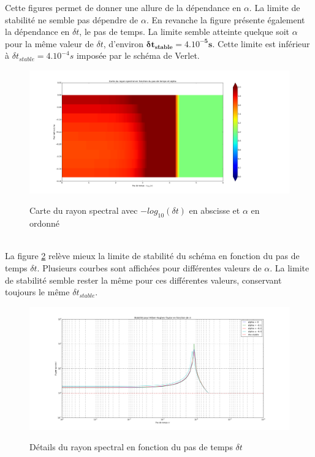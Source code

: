 \documentclass[11pt, a4paper]{article}
\begin{document}
Cette figures permet de donner une allure de la dépendance en $\alpha$. La limite de stabilité ne semble pas dépendre de $\alpha$. En revanche la figure présente également la dépendance en $\delta t$, le pas de temps. La limite semble atteinte quelque soit $\alpha$ pour la même valeur de $\delta t$, d'environ $ \mathbf{\delta t_{stable} = 4.10^{-5}s }$. Cette limite est inférieur à $\delta t_{stable} = 4.10^{-4}s$ imposée par le schéma de Verlet.
\begin{figure}
	\centering
	\includegraphics[width=1\linewidth]{figures/Part5/MapRhoHHT.png}
	\label{MapRhoHHT}
	\caption{Carte du rayon spectral avec $-log_{10}(\delta t)$ en abscisse et $\alpha$ en ordonné}
\end{figure}
\\

La figure \ref{RhoHHT} relève mieux la limite de stabilité du schéma en fonction du pas de temps $\delta t$. Plusieurs courbes sont affichées pour différentes valeurs de $\alpha$. La limite de stabilité semble rester la même pour ces différentes valeurs, conservant toujours le même $\delta t_{stable}$. 
\begin{figure}
	\centering
	\includegraphics[width=1\linewidth]{figures/Part5/RhoHHT.png}
	\label{RhoHHT}
	\caption{Détails du rayon spectral en fonction du pas de temps $\delta t$}
\end{figure}
\\
\end{document}
